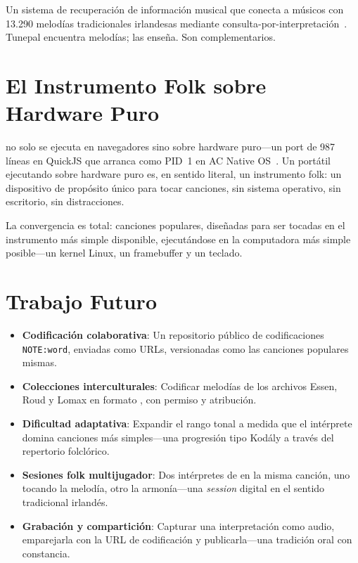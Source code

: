 \documentclass[11pt]{article}
\begin{document}
\begin{card}
Un sistema de recuperación de información musical que conecta a músicos con 13.290 melodías tradicionales irlandesas mediante consulta-por-interpretación~\citep{duggan2009tunepal}. Tunepal encuentra melodías; \np{} las enseña. Son complementarios.
\end{card}

\section{El Instrumento Folk sobre Hardware Puro}

\np{} no solo se ejecuta en navegadores sino sobre hardware puro---un port de 987 líneas en QuickJS que arranca como PID~1 en AC Native OS~\citep{scudder2026os}. Un portátil ejecutando \np{} sobre hardware puro es, en sentido literal, un instrumento folk: un dispositivo de propósito único para tocar canciones, sin sistema operativo, sin escritorio, sin distracciones.

\begin{accentcard}
La convergencia es total: canciones populares, diseñadas para ser tocadas en el instrumento más simple disponible, ejecutándose en la computadora más simple posible---un kernel Linux, un framebuffer y un teclado.
\end{accentcard}

\section{Trabajo Futuro}

\begin{card}
\begin{itemize}
  \item \textbf{Codificación colaborativa}: Un repositorio público de codificaciones \texttt{NOTE:word}, enviadas como URLs, versionadas como las canciones populares mismas.
  \item \textbf{Colecciones interculturales}: Codificar melodías de los archivos Essen, Roud y Lomax en formato \np{}, con permiso y atribución.
  \item \textbf{Dificultad adaptativa}: Expandir el rango tonal a medida que el intérprete domina canciones más simples---una progresión tipo Kod\'aly a través del repertorio folclórico.
  \item \textbf{Sesiones folk multijugador}: Dos intérpretes de \np{} en la misma canción, uno tocando la melodía, otro la armonía---una \textit{session} digital en el sentido tradicional irlandés.
  \item \textbf{Grabación y compartición}: Capturar una interpretación como audio, emparejarla con la URL de codificación y publicarla---una tradición oral con constancia.
\end{itemize}
\end{card}
\end{document}

